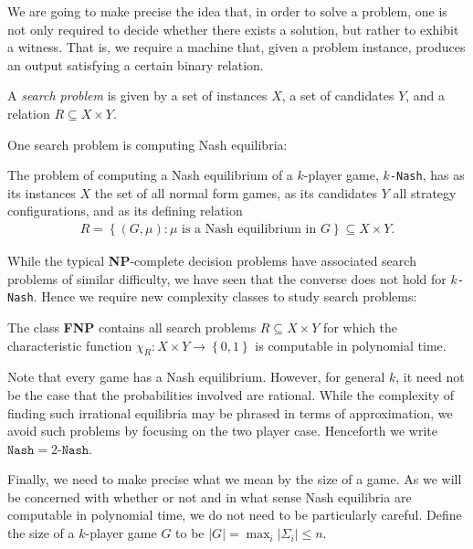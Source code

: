 \documentclass{article}
\begin{document}
We are going to make precise the idea that, in order to solve
a problem, one is not only required to decide whether there exists
a solution, but rather to exhibit a witness. That is, we require a
machine that, given a problem instance, produces an output satisfying
a certain binary relation.

\begin{definition}
  A \emph{search problem} is given by a set of instances $X$,
  a set of candidates $Y$, and a relation $R\subseteq X\times Y$.
\end{definition}

One search problem is computing Nash equilibria:

\begin{definition}\label{def:nash}
  The problem of computing a Nash equilibrium of a $k$-player game,
  $k$\texttt{-Nash}, has as its instances $X$ the set of all normal
  form games, as its candidates $Y$ all strategy configurations, and
  as its defining relation
  \begin{align*}
    R = \left\lbrace{ (G,\mu) : \text{$\mu$ is a Nash equilibrium in $G$}}\right\rbrace\subseteq X\times Y.
  \end{align*}
\end{definition}

While the typical \textbf{NP}-complete decision problems have
associated search problems of similar difficulty, 
we have seen that the converse does not hold for $k$\texttt{-Nash}. Hence
we require new complexity classes to study search problems:

\begin{definition}
  The class \textbf{FNP} contains all search problems $R\subseteq X\times Y$
  for which the characteristic function $\chi_R : X\times
  Y\to\left\lbrace{0,1}\right\rbrace$ is computable in polynomial time.
\end{definition}

Note that every game has a Nash equilibrium. However, for general $k$,
it need not be the case that the probabilities involved are rational.
While the complexity of finding such irrational equilibria may be
phrased in terms of approximation, we avoid such problems by focusing
on the two player case. Henceforth we write $\texttt{Nash}=2\texttt{-Nash}$.

Finally, we need to make precise what we mean by the size of a game.
As we will be concerned with whether or not and in what sense Nash
equilibria are computable in polynomial time, we do not need to be
particularly careful. Define the size of a $k$-player game $G$ to be
$|G|=\max_i|\Sigma_i|\leq n$.
\end{document}
